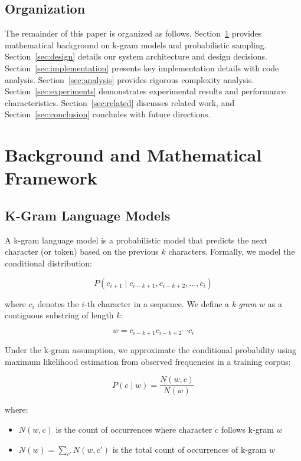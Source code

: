 \documentclass[11pt,letterpaper]{article}
\begin{document}
\subsection{Organization}

The remainder of this paper is organized as follows. Section~\ref{sec:background} provides mathematical background on k-gram models and probabilistic sampling. Section~\ref{sec:design} details our system architecture and design decisions. Section~\ref{sec:implementation} presents key implementation details with code analysis. Section~\ref{sec:analysis} provides rigorous complexity analysis. Section~\ref{sec:experiments} demonstrates experimental results and performance characteristics. Section~\ref{sec:related} discusses related work, and Section~\ref{sec:conclusion} concludes with future directions.

\section{Background and Mathematical Framework}\label{sec:background}

\subsection{K-Gram Language Models}

A k-gram language model is a probabilistic model that predicts the next character (or token) based on the previous $k$ characters. Formally, we model the conditional distribution:

\begin{equation}
P(c_{i+1} \mid c_{i-k+1}, c_{i-k+2}, \ldots, c_i)
\end{equation}

where $c_i$ denotes the $i$-th character in a sequence. We define a \emph{k-gram} $w$ as a contiguous substring of length $k$:

\begin{equation}
w = c_{i-k+1}c_{i-k+2}\cdots c_i
\end{equation}

Under the k-gram assumption, we approximate the conditional probability using maximum likelihood estimation from observed frequencies in a training corpus:

\begin{equation}\label{eq:mle}
P(c \mid w) = \frac{N(w, c)}{N(w)}
\end{equation}

where:
\begin{itemize}
    \item $N(w, c)$ is the count of occurrences where character $c$ follows k-gram $w$
    \item $N(w) = \sum_{c'} N(w, c')$ is the total count of occurrences of k-gram $w$
\end{itemize}
\end{document}
